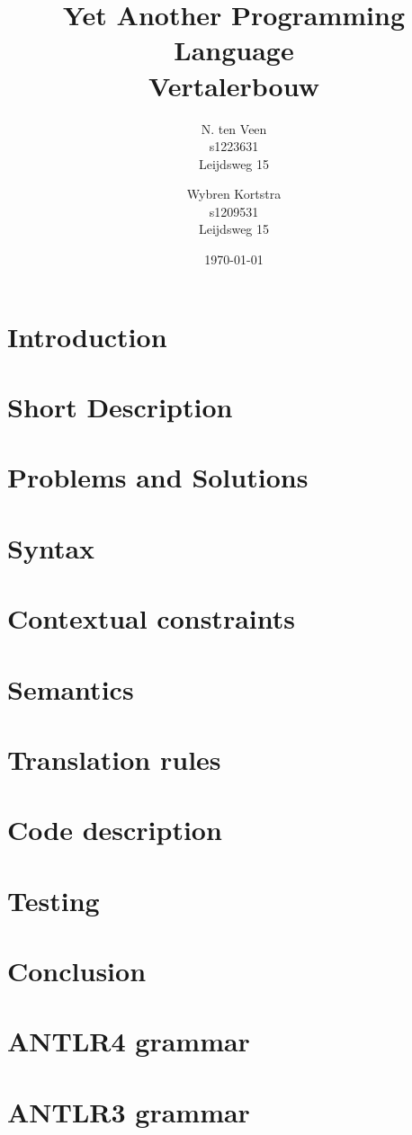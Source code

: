 \documentclass[a4paper]{report}
\title{
	Yet Another Programming Language \\
	{\large Vertalerbouw }
}
\author{
	N. ten Veen \\
    s1223631 \\
    Leijdsweg 15
	\and
    Wybren Kortstra \\
    s1209531 \\
    Leijdsweg 15
}
\date{\today}
\begin{document}
\maketitle

\tableofcontents \pagebreak

\chapter{Introduction}



\chapter{Short Description}


\chapter{Problems and Solutions}


\chapter{Syntax}



\chapter{Contextual constraints}


\chapter{Semantics}

\chapter{Translation rules}

\chapter{Code description}

\chapter{Testing}
\chapter{Conclusion}


\begin{appendices}
\chapter{ANTLR4 grammar}
\chapter{ANTLR3 grammar}
\label{app:antlr3}


\end{appendices}
\end{document}
